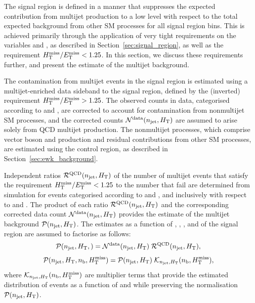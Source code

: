 The signal region is defined in a manner that suppresses the expected
contribution from multijet production to a low level with respect to
the total expected background from other SM processes for all signal
region bins. This is achieved primarily through the application of
very tight requirements on the variables \alphat and \dphi, as
described in Section~\ref{sec:signal_region}, as well as the
requirement $H_{\mathrm{T}}^{\text{miss}} / E_{\mathrm{T}}^{\text{miss}} < 1.25$. In this section, we discuss these
requirements further, and present the estimate of the multijet
background.

The contamination from multijet events in the signal region is
estimated using a multijet-enriched data sideband to the signal
region, defined by the (inverted) requirement $H_{\mathrm{T}}^{\text{miss}} / E_{\mathrm{T}}^{\text{miss}} > 1.25$. The
observed counts in data, categorised according to \njet and \scalht,
are corrected to account for contamination from nonmultijet SM
processes, and the corrected counts $\mathcal{N}^\text{data}(n_{\text{jet}},
H_{\mathrm{T}})$ are assumed to arise solely from QCD multijet
production. The nonmultijet processes, which comprise vector boson
and \ttbar production and residual contributions from other SM
processes, are estimated using the \mj control region, as
described in Section~\ref{sec:ewk_background}.

Independent ratios $\mathcal{R}^\mathrm{QCD}(n_{\text{jet}}, H_{\mathrm{T}})$ of the
number of multijet events that satisfy the requirement $H_{\mathrm{T}}^{\text{miss}} / E_{\mathrm{T}}^{\text{miss}} <
1.25$ to the number that fail are determined from simulation for
events categorised according to \njet and \scalht, and inclusively
with respect to \nb and \HTmiss. The product of each ratio
$\mathcal{R}^\mathrm{QCD}(n_{\text{jet}}, H_{\mathrm{T}})$ and the corresponding
corrected data count $\mathcal{N}^\text{data}(n_{\text{jet}}, H_{\mathrm{T}})$
provides the estimate of the multijet background $\mathcal{P}(n_{\text{jet}},
H_{\mathrm{T}})$. The estimates as a function of \njet, \scalht, \nb, and
\HTmiss of the signal region are assumed to factorise as follows:
\begin{equation}
  \label{eq:qcd1}
  \mathcal{P}( n_{\text{jet}}, H_{\mathrm{T}}, )  = 
  \mathcal{N}^\text{data}( n_{\text{jet}}, H_{\mathrm{T}} )\;
  \mathcal{R}^\mathrm{QCD}( n_{\text{jet}}, H_{\mathrm{T}} ),
\end{equation}
\begin{equation}
  \label{eq:qcd2}
  \mathcal{P}( n_{\text{jet}}, H_{\mathrm{T}}, n_{\text{b}}, H_{\mathrm{T}}^{\text{miss}} ) = 
  \mathcal{P}( n_{\text{jet}}, H_{\mathrm{T}} )\;
  \mathcal{K}_{n_{\text{jet}}, H_{\mathrm{T}}}( n_{\text{b}}, H_{\mathrm{T}}^{\text{miss}} ), 
\end{equation}
where $\mathcal{K}_{n_{\text{jet}}, H_{\mathrm{T}}}( n_{\text{b}}, H_{\mathrm{T}}^{\text{miss}} )$ are multiplier
terms that provide the estimated distribution of events as a function
of \nb and \HTmiss while preserving the normalisation $\mathcal{P}(
n_{\text{jet}}, H_{\mathrm{T}} )$.

